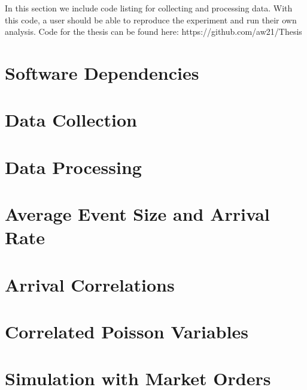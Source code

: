 In this section we include code listing for collecting and processing data. With this code, a user should be able to reproduce the experiment and run their own analysis. Code for the thesis can be found here: https://github.com/aw21/Thesis

\section{Software Dependencies}


\section{Data Collection}
\label{data-collection-code}

\section{Data Processing}
\label{data-processing-code}

\section{Average Event Size and Arrival Rate}
\label{AES_and_rate_code}

\section{Arrival Correlations}
\label{correlation-code}

\section{Correlated Poisson Variables}
\label{correlated-poisson}

\section{Simulation with Market Orders}
\label{code:simulation}